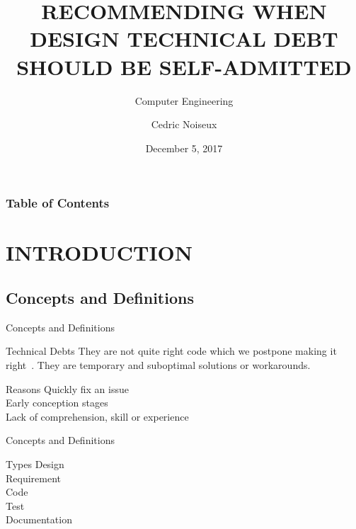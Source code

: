 \documentclass{beamer}
\title{
RECOMMENDING WHEN DESIGN TECHNICAL DEBT SHOULD BE SELF-ADMITTED} %
\subtitle{Computer Engineering} %
\author{Cedric Noiseux}
\date{December 5, 2017}
\begin{document}
	\begin{darkframes}
		
		\frame{\maketitle}
  
  		
				\begin{frame}[allowframebreaks]
					\frametitle{Table of Contents}
					\tableofcontents[sections={1-2}]
						\framebreak
					\tableofcontents[sections={3-4}]
				\end{frame}
	
		\section{INTRODUCTION}
		
	
			\subsection{Concepts and Definitions}	  
				\begin{frame}{Concepts and Definitions}		
					\begin{block}{Technical Debts}
						They are not quite right code which we postpone making it right~\cite{cunn92}. They are temporary and suboptimal solutions or workarounds.
					\end{block}
					\begin{block}{Reasons}
						Quickly fix an issue\\
						Early conception stages\\
						Lack of comprehension, skill or experience	
					\end{block}
				\end{frame}
						
				\begin{frame}{Concepts and Definitions}	
					\begin{block}{Types}
						Design\\
						Requirement\\
						Code\\
						Test\\
						Documentation
					\end{block}	
				\end{frame}
			

\end{darkframes}
\end{document}

